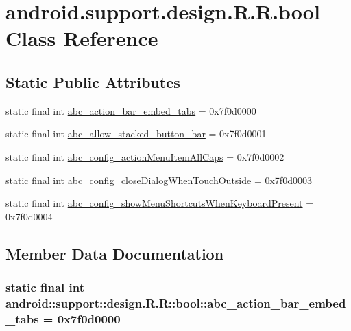 \hypertarget{classandroid_1_1support_1_1design_1_1_r_1_1bool}{
\section{android.support.design.R.R.bool Class Reference}
\label{classandroid_1_1support_1_1design_1_1_r_1_1bool}
}
\subsection*{Static Public Attributes}
\begin{CompactItemize}
\item 
static final int \hyperlink{classandroid_1_1support_1_1design_1_1_r_1_1bool_197a847024a19a2833b675581528b8cb}{abc\_\-action\_\-bar\_\-embed\_\-tabs} = 0x7f0d0000
\item 
static final int \hyperlink{classandroid_1_1support_1_1design_1_1_r_1_1bool_180391edcf54546e93fb36450d865f23}{abc\_\-allow\_\-stacked\_\-button\_\-bar} = 0x7f0d0001
\item 
static final int \hyperlink{classandroid_1_1support_1_1design_1_1_r_1_1bool_f5a0db0998ead2c417ff96dca75ae86c}{abc\_\-config\_\-actionMenuItemAllCaps} = 0x7f0d0002
\item 
static final int \hyperlink{classandroid_1_1support_1_1design_1_1_r_1_1bool_6c32aa29409b3c233fd1dcdef3ae5655}{abc\_\-config\_\-closeDialogWhenTouchOutside} = 0x7f0d0003
\item 
static final int \hyperlink{classandroid_1_1support_1_1design_1_1_r_1_1bool_0149501b311f4896354a8685e45e32ea}{abc\_\-config\_\-showMenuShortcutsWhenKeyboardPresent} = 0x7f0d0004
\end{CompactItemize}


\subsection{Member Data Documentation}
\hypertarget{classandroid_1_1support_1_1design_1_1_r_1_1bool_197a847024a19a2833b675581528b8cb}{
\subsubsection[{abc\_\-action\_\-bar\_\-embed\_\-tabs}]{\setlength{\rightskip}{0pt plus 5cm}static final int android::support::design.R.R::bool::abc\_\-action\_\-bar\_\-embed\_\-tabs = 0x7f0d0000}}
\label{classandroid_1_1support_1_1design_1_1_r_1_1bool_197a847024a19a2833b675581528b8cb}


